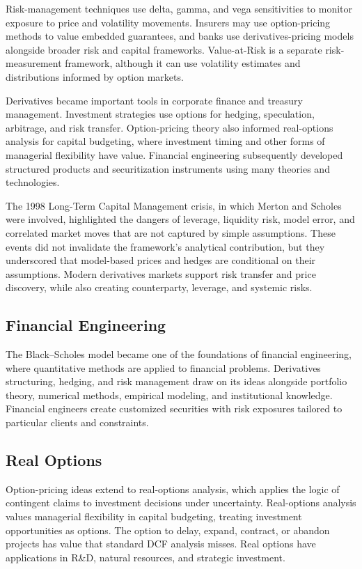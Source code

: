 Risk-management techniques use delta, gamma, and vega sensitivities to monitor
exposure to price and volatility movements. Insurers may use option-pricing
methods to value embedded guarantees, and banks use derivatives-pricing models
alongside broader risk and capital frameworks. Value-at-Risk is a separate risk-
measurement framework, although it can use volatility estimates and distributions
informed by option markets.

Derivatives became important tools in corporate finance and treasury management.
Investment strategies use options for hedging, speculation, arbitrage, and risk
transfer. Option-pricing theory also informed real-options analysis for capital
budgeting, where investment timing and other forms of managerial flexibility have
value. Financial engineering subsequently developed structured products and
securitization instruments using many theories and technologies.

The 1998 Long-Term Capital Management crisis, in which Merton and Scholes were
involved, highlighted the dangers of leverage, liquidity risk, model error, and
correlated market moves that are not captured by simple assumptions. These events
did not invalidate the framework's analytical contribution, but they underscored
that model-based prices and hedges are conditional on their assumptions. Modern
derivatives markets support risk transfer and price discovery, while also
creating counterparty, leverage, and systemic risks.

\subsection*{Financial Engineering}
The Black--Scholes model became one of the foundations of financial engineering,
where quantitative methods are applied to financial problems. Derivatives
structuring, hedging, and risk management draw on its ideas alongside portfolio
theory, numerical methods, empirical modeling, and institutional knowledge.
Financial engineers create customized securities with risk exposures tailored to
particular clients and constraints.

\subsection*{Real Options}
Option-pricing ideas extend to real-options analysis, which applies the logic of
contingent claims to investment decisions under uncertainty. Real-options analysis
values managerial flexibility in capital budgeting, treating investment
opportunities as options.
The option to delay, expand, contract, or abandon projects has value that standard
DCF analysis misses. Real options have applications in R\&D, natural resources,
and strategic investment.

